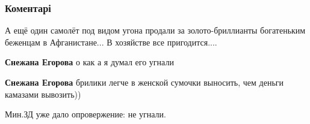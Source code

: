  
 
 
 
 
\subsubsection{Коментарі}

\begin{itemize}
 
А ещё один самолёт под видом угона продали за золото-бриллианты богатеньким беженцам в Афганистане...
В хозяйстве все пригодится....

\begin{itemize}
 
\textbf{Снежана Егорова} о как а я думал его угнали

 
\textbf{Снежана Егорова} брилики легче в женской сумочки выносить, чем деньги камазами вывозить))

 
Мин.ЗД уже дало опровержение: не угнали.
\end{itemize}

 


\end{itemize}
